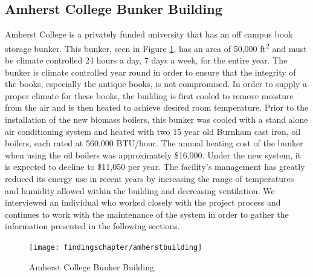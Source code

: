 \subsection{Amherst College Bunker Building}
\par Amherst College is a privately funded university that has an off campus book storage bunker. This bunker, seen in Figure \ref{fig:bunker}, has an area of 50,000 ft\textsuperscript{2} and must be climate controlled 24 hours a day, 7 days a week, for the entire year. The bunker is climate controlled year round in order to ensure that the integrity of the books, especially the antique books, is not compromised. In order to supply a proper climate for these books, the building is first cooled to remove moisture from the air and is then heated to achieve desired room temperature. Prior to the installation of the new biomass boilers, this bunker was cooled with a stand alone air conditioning system and heated with two 15 year old Burnham cast iron, oil boilers, each rated at 560,000 BTU/hour. The annual heating cost of the bunker when using the oil boilers was approximately \$16,000. Under the new system, it is expected to decline to \$11,050 per year. The facility’s management has greatly reduced its energy use in recent years by increasing the range of temperatures and humidity allowed within the building and decreasing ventilation. We interviewed an individual who worked closely with the project process and continues to work with the maintenance of the system in order to gather the information presented in the following sections.
\begin{figure}[H]
\centering
\texttt{[image: findingschapter/amherstbuilding]}
\caption{Amherst College Bunker Building}
\label{fig:bunker}
\end{figure}

